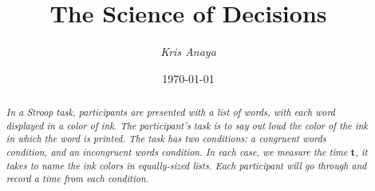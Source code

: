 \documentclass[8pt]{article}
\newcommand{\8}{\bar}
\begin{document}
 
\title{The Science of Decisions} 
\author{\textit{Kris Anaya}}
\date{\today} 
\maketitle

\begin{abstract} 
\textit{In a Stroop task, participants are presented with a list of words, with each word displayed in a color of ink. The participant's task is to say out loud the color of the ink in which the word is printed. The task has two conditions: a congruent words condition, and an incongruent words condition. In each case, we measure the time $\textbf{t}$, it takes to name the ink colors in equally-sized lists. Each participant will go through and record a time from each condition.} 
\end{abstract}
\end{document}
